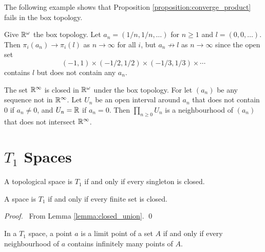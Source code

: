 The following example shows that Proposition \ref{proposition:converge_product} fails in the box topology.

\begin{example}
    Give $\mathbb{R}^\omega$ the box topology. Let $a_n = (1/n, 1/n, \ldots)$ for $n \geq 1$ and $l = (0, 0, \ldots)$. Then $\pi_i(a_n) \rightarrow \pi_i(l)$
    as $n \rightarrow \infty$ for all $i$, but $a_n \not\rightarrow l$ as $n \rightarrow \infty$ since the open set
    \[ (-1,1) \times (-1/2, 1/2) \times (-1/3,1/3) \times \cdots \]
    contains $l$ but does not contain any $a_n$.
\end{example}

\begin{example}
    The set $\mathbb{R}^\infty$ is closed in $\mathbb{R}^\omega$ under the box topology. For let $(a_n)$ be any sequence not in $\mathbb{R}^\infty$.
    Let $U_n$ be an open interval around $a_n$ that does not contain $0$ if $a_n \neq 0$, and $U_n = \mathbb{R}$ if $a_n = 0$.
    Then $\prod_{n \geq 0} U_n$ is a neighbourhood of $(a_n)$ that does not intersect $\mathbb{R}^\infty$.
\end{example}

\section{$T_1$ Spaces}

\begin{definition}[$T_1$ Space]
    A topological space is $T_1$ if and only if every singleton is closed.
\end{definition}

\begin{lemma}
    A space is $T_1$ if and only if every finite set is closed.
\end{lemma}

\begin{proof}
    \pf\ From Lemma \ref{lemma:closed_union}. \qed
\end{proof}

\begin{theorem}
    In a $T_1$ space, a point $a$ is a limit point of a set $A$ if and only if every neighbourhood of $a$
    contains infinitely many points of $A$.
\end{theorem}

